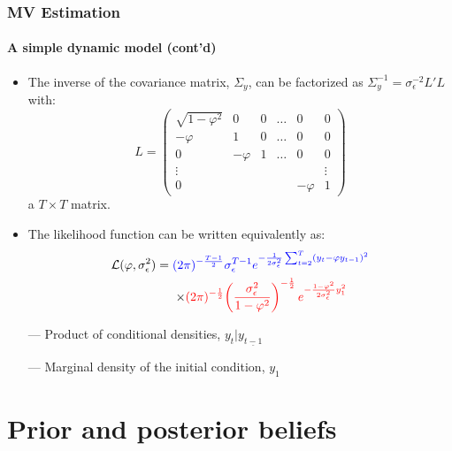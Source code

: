\documentclass[10pt,slidestop]{beamer}
\begin{document}
\begin{frame}
  \frametitle{MV Estimation}
  \framesubtitle{A simple dynamic model (cont'd)}

    \begin{itemize}
      \item The inverse of the covariance
      matrix, $\Sigma_y$, can be factorized as $\Sigma_y ^{-1}=
      \sigma_{\epsilon}^{-2}L'L$ with:
      {\tiny\[
        L =
        \begin{pmatrix}
          \sqrt{1-\varphi^2} & 0 & 0 & \dots & 0 & 0\\
          -\varphi & 1 & 0 &\dots & 0 & 0 \\
          0 & -\varphi & 1 & \dots & 0 & 0 \\
          \vdots & &&&& \vdots \\
          0 & &&&-\varphi & 1
        \end{pmatrix}
      \]}
    a $T\times T$ matrix.

\bigskip

    \item The likelihood function can be
    written equivalently as:\newline
    \[
      \begin{split}
        \mathcal L(\varphi,\sigma_{\epsilon}^2) =
    {\color{blue}(2\pi)^{-\frac{T-1}{2}}}&{\color{blue}\sigma_{\epsilon}^{T-1}e^{-\frac{1}{2\sigma_{\epsilon}^2}\sum_{t=2}^T\left(y_t-\varphi
      y_{t-1}\right)^2}}\\
    \times {\color{red}(2\pi)^{-\frac{1}{2}}}&{\color{red}\left(\frac{\sigma_{\epsilon}^2}{1-\varphi^2}\right)^{-\frac{1}{2}}
    e^{-\frac{1-\varphi^2}{2\sigma_{\epsilon}^2}y_1^2}}
      \end{split}
    \]

    \bigskip

    {\color{blue} --- Product of conditional densities,
      $y_t|y_{\underline{t-1}}$}\newline

    {\color{red} --- Marginal density of the initial condition, $y_1$}\newline
    \end{itemize}
  \end{frame}

\section{Prior and posterior beliefs}
\end{document}
